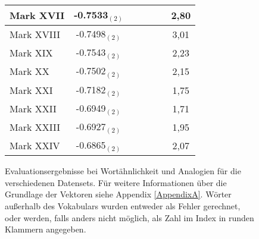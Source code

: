 \begin{landscape}
\begin{figure}[h]
\begin{tabular}{l||c|c|c|c||c|c}
      Mark XVII & -0.7533$_{(2)}$ & & & & & 2,80 \\
      \hline
      Mark XVIII & -0.7498$_{(2)}$ & & & & & 3,01 \\
      \hline
      Mark XIX & -0.7543$_{(2)}$ & & & & & 2,23 \\
      \hline
      Mark XX & -0.7502$_{(2)}$ & & & & & 2,15 \\
      \hline
      Mark XXI & -0.7182$_{(2)}$ & & & & & 1,75 \\
      \hline
      Mark XXII & -0.6949$_{(2)}$ & & & & & 1,71 \\
      \hline
      Mark XXIII & -0.6927$_{(2)}$ & & & & & 1,95 \\
      \hline
      Mark XXIV & -0.6865$_{(2)}$ & & & & & 2,07 \\
    \end{tabular}
    \caption[Evaluationsergebnisse bei Wortähnlichkeit und Analogien]{Evaluationsergebnisse bei Wortähnlichkeit und Analogien für die verschiedenen Datensets. Für weitere
    Informationen über die Grundlage der Vektoren siehe Appendix \ref{AppendixA}. Wörter außerhalb des Vokabulars wurden entweder als Fehler gerechnet, oder
    werden, falls anders nicht möglich, als Zahl im Index in runden Klammern angegeben.}
  \end{figure}
\end{landscape}
\newpage
